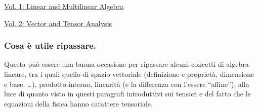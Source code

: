  \href{http://oaktrust.library.tamu.edu/bitstream/handle/1969.1/2502/IntroductionToVectorsAndTensorsVol1.pdf}
 {Vol. 1: Linear and Multilinear Algebra}
 
 \href{http://oaktrust.library.tamu.edu/bitstream/handle/1969.1/3609/IntroductionToVectorsAndTensorsVol2.pdf}
 {Vol. 2: Vector and Tensor Analysis}
 
 
 
 \subsubsection{Cosa è utile ripassare.} Questa può essere una buona occasione per ripassare alcuni concetti di algebra lineare, tra i quali quello di spazio vettoriale (definizione e proprietà, dimensione e base, \dots), prodotto interno, linearità (e la differenza con l'essere ``affine''), alla luce di quanto visto in questi paragrafi introduttivi sui tensori e del fatto che le equazioni della fisica hanno carattere tensoriale.





